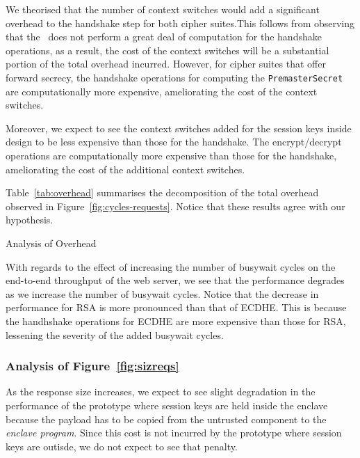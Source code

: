 \documentclass[../../../main.tex]{subfiles}
\begin{document}
We theorised that the number of context switches would add a
significant overhead to the handshake step for both cipher suites.This
follows from observing that the \enclaveprogram~does not perform a
great deal of computation for the handshake operations, as a result,
the cost of the context switches will be a substantial portion of the
total overhead incurred. However, for cipher suites that offer forward
secrecy, the handshake operations for computing the \texttt{PremasterSecret}
are computationally more expensive, ameliorating the cost of the context
switches.

Moreover, we expect to see the context switches added for the session
keys inside design to be less expensive than those for the handshake.
The encrypt/decrypt operations are computationally more expensive than
those for the handshake, ameliorating the cost of the additional
context switches.

Table~\ref{tab:overhead} summarises the decomposition of the total
overhead observed in Figure~\ref{fig:cycles-requests}. Notice that
these results agree with our hypothesis.

\begin{table}[H]
  \caption{Analysis of Overhead}
  \label{tab:overhead}
\end{table}

With regards to the effect of increasing the number of busywait cycles
on the end-to-end throughput of the web server, we see that the
performance degrades as we increase the number of busywait cycles.
Notice that the decrease in performance for RSA is more pronounced
than that of ECDHE. This is because the handhshake operations for
ECDHE are more expensive than those for RSA, lessening the severity of
the added busywait cycles.
\subsubsection*{Analysis of Figure~\ref{fig:sizreqs}}
As the response size increases, we expect to see slight degradation in
the performance of the prototype where session keys are held inside
the enclave because the payload has to be copied from the untrusted
component to the \textit{enclave program}. Since this cost is not
incurred by the prototype where session keys are outisde, we do not
expect to see that penalty.
\end{document}

